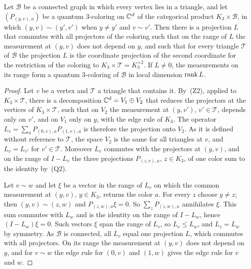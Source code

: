 \begin{lemma}\label{lem:bottom}
Let $\mathcal B$ be a connected graph in which every vertex lies in a triangle, and let $(P_{(y,v),a})$ be a quantum $3$-coloring on $\mathbb C^d$ of the categorical product $K_3\times\mathcal B$, in which $(y,v)\sim(y',v')$ when $y\ne y'$ and $v\sim v'$. Then there is a projection $L$ that commutes with all projectors of the coloring such that on the range of $L$ the measurement at $(y,v)$ does not depend on $y$, and such that for every triangle $\mathcal T$ of $\mathcal B$ the projection $L$ is the coordinate projection of the second coordinate for the restriction of the coloring to $K_3\times\mathcal T=K_3^{\times2}$. If $L\ne0$, the measurements on its range form a quantum $3$-coloring of $\mathcal B$ in local dimension $\operatorname{rank} L$.
\end{lemma}
\begin{proof}
Let $v$ be a vertex and $\mathcal T$ a triangle that contains it. By~(Z2), applied to $K_3\times\mathcal T$, there is a decomposition $\mathbb C^d=V_1\oplus V_2$ that reduces the projectors at the vertices of $K_3\times\mathcal T$, such that on $V_2$ the measurement at $(y,v')$, $v'\in\mathcal T$, depends only on $v'$, and on $V_1$ only on $y$, with the edge rule of $K_3$. The operator $L_v=\sum_aP_{(0,v),a}P_{(1,v),a}$ is therefore the projection onto $V_2$. As it is defined without reference to $\mathcal T$, the space $V_2$ is the same for all triangles at $v$, and $L_v=L_{v'}$ for $v'\in\mathcal T$. Moreover $L_v$ commutes with the projectors at $(y,v)$, and on the range of $I-L_v$ the three projections $P_{(z,v),a}$, $z\in K_3$, of one color sum to the identity by~(Q2).

Let $v\sim w$ and let $\xi$ be a vector in the range of $L_v$ on which the common measurement at $(y,v)$, $y\in K_3$, returns the color $a$. For every $z$ choose $y\ne z$; then $(y,v)\sim(z,w)$ and $P_{(z,w),a}\xi=0$. So $\sum_zP_{(z,w),a}$ annihilates $\xi$. This sum commutes with $L_w$ and is the identity on the range of $I-L_w$, hence $(I-L_w)\xi=0$. Such vectors $\xi$ span the range of $L_v$, so $L_v\le L_w$, and $L_v=L_w$ by symmetry. As $\mathcal B$ is connected, all $L_v$ equal one projection $L$, which commutes with all projectors. On its range the measurement at $(y,v)$ does not depend on $y$, and for $v\sim w$ the edge rule for $(0,v)$ and $(1,w)$ gives the edge rule for $v$ and $w$.
\end{proof}

